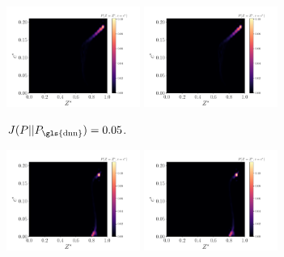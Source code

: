 \documentclass[review]{elsarticle}
\begin{document}
\begin{figure}[!tbp]%
  \centering%
  \begin{subfigure}[t]{\textwidth}%
    \includegraphics[page=3,width=0.48\textwidth, trim=0.2cm 0cm 1cm 1cm, clip=true]{./figs/pdfs_66089.pdf}\hfill%
    \includegraphics[page=4,width=0.48\textwidth, trim=0.2cm 0cm 1cm 1cm, clip=true]{./figs/pdfs_66089.pdf}%
    \caption{$J(P||P_{\text{\gls{dnn}}})=0.05$.}\label{fig:}%
  \end{subfigure}\hfill%
  \begin{subfigure}[t]{\textwidth}%
    \includegraphics[page=3,width=0.48\textwidth, trim=0.2cm 0cm 1cm 1cm, clip=true]{./figs/pdfs_159948.pdf}\hfill%
    \includegraphics[page=4,width=0.48\textwidth, trim=0.2cm 0cm 1cm 1cm, clip=true]{./figs/pdfs_159948.pdf}%

\end{subfigure}
\end{figure}
\end{document}
